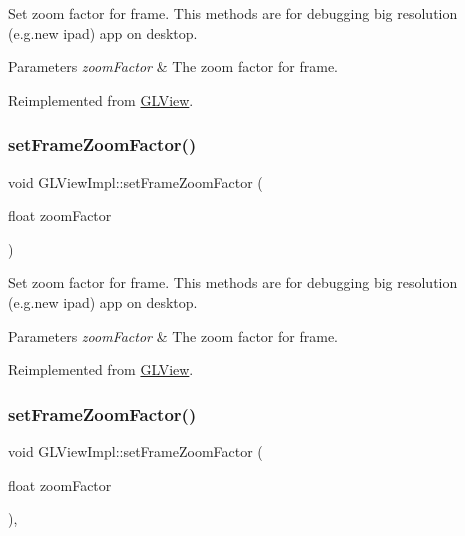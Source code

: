 Set zoom factor for frame. This methods are for debugging big resolution (e.\+g.\+new ipad) app on desktop.


\begin{DoxyParams}{Parameters}
{\em zoom\+Factor} & The zoom factor for frame. \\
\hline
\end{DoxyParams}


Reimplemented from \hyperlink{classGLView_afe38f42b6954c9bc29382f411b49f448}{G\+L\+View}.

\mbox{\label{classGLViewImpl_a1fbfd81198efe1e87f725b2dfa53bab8}} 
\subsubsection{\texorpdfstring{set\+Frame\+Zoom\+Factor()}{setFrameZoomFactor()}\hspace{0.1cm}{\footnotesize\ttfamily [3/4]}}
{\footnotesize\ttfamily void G\+L\+View\+Impl\+::set\+Frame\+Zoom\+Factor (\begin{DoxyParamCaption}\item[{float}]{zoom\+Factor }\end{DoxyParamCaption})\hspace{0.3cm}{\ttfamily [virtual]}}

Set zoom factor for frame. This methods are for debugging big resolution (e.\+g.\+new ipad) app on desktop.


\begin{DoxyParams}{Parameters}
{\em zoom\+Factor} & The zoom factor for frame. \\
\hline
\end{DoxyParams}


Reimplemented from \hyperlink{classGLView_afe38f42b6954c9bc29382f411b49f448}{G\+L\+View}.

\mbox{\label{classGLViewImpl_a7db37b677458517eb4a2563bae912d1e}} 
\subsubsection{\texorpdfstring{set\+Frame\+Zoom\+Factor()}{setFrameZoomFactor()}\hspace{0.1cm}{\footnotesize\ttfamily [4/4]}}
{\footnotesize\ttfamily void G\+L\+View\+Impl\+::set\+Frame\+Zoom\+Factor (\begin{DoxyParamCaption}\item[{float}]{zoom\+Factor }\end{DoxyParamCaption})\hspace{0.3cm}{\ttfamily [protected]}, {\ttfamily [virtual]}}

